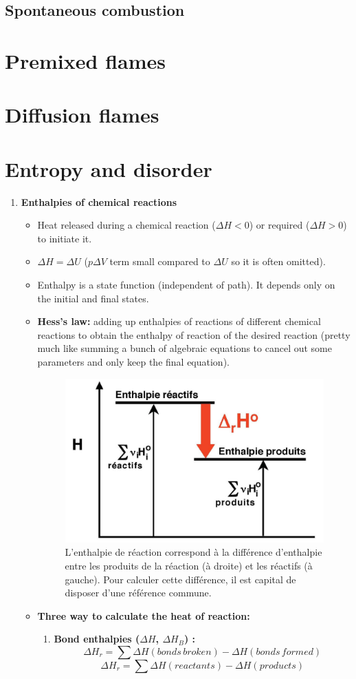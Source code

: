 \documentclass[a4paper,11pt]{article}
\begin{document}
\subsection{Spontaneous combustion}
\pagebreak
\section{Premixed flames}
\pagebreak
\section{Diffusion flames}
\pagebreak


\appendix
\section{Entropy and disorder}
\begin{enumerate}
\item \textbf{Enthalpies of chemical reactions}
\noindent    
\begin{itemize}
\[\Delta H = H_f - H_i \]
\item Heat released during a chemical reaction ($\Delta H<0$) or required ($\Delta H>0$) to initiate it.
\item $\Delta H = \Delta U$ ($p \Delta V$ term small compared to $\Delta U$ so it is often omitted).
\item Enthalpy is a state function (independent of path). It depends only on the initial and final states.
\item \textbf{Hess's law:} adding up enthalpies of reactions of different chemical reactions to obtain the enthalpy of reaction of the desired reaction (pretty much like summing a bunch of algebraic equations to cancel out some parameters and only keep the final equation).
\begin{figure}[h]
\centering                \includegraphics[width=.4\linewidth]{figures/EtatRefEnthalpie.jpeg}
\caption{L'enthalpie de réaction correspond à la différence d'enthalpie entre les produits de la réaction (à droite) et les réactifs (à gauche). Pour calculer cette différence, il est capital de disposer d'une référence commune.}
\end{figure}
\item \textbf{Three way to calculate the heat of reaction:}
\begin{enumerate}
    \item \textbf{Bond enthalpies ($\Delta H$, $\Delta H_B$) :} 
    \[\Delta H_r = \sum \Delta H(bonds \,broken) - \Delta H(bonds\, formed)\]
    \[\Delta H_r = \sum \Delta H(reactants) - \Delta H(products)\]
    

\end{enumerate}
\end{itemize}
\end{enumerate}
\end{document}

